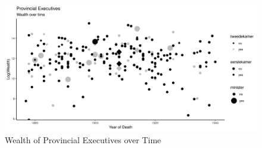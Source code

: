 \begin{landscape}

\clearpage


\begin{figure}
    \centering
    \includegraphics[scale = 0.80]{figures/wealth_dep.png}
    \caption{Wealth of Provincial Executives over Time}
    \label{fig:avgwealthprovexec}
\end{figure}
\clearpage
\end{landscape}





